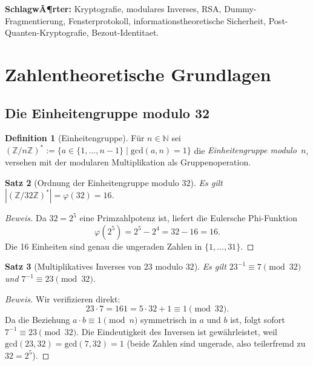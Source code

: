 ﻿\documentclass[12pt, a4paper]{article}
\theoremstyle{plain}
\newtheorem{theorem}{Satz}[section]
\theoremstyle{definition}
\newtheorem{definition}[theorem]{Definition}
\theoremstyle{remark}
\newenvironment{myproof}[1][Beweis]{%
  \begin{proof}[#1]
}{%
  \end{proof}
}
\newcommand{\Z}{\mathbb{Z}}
\newcommand{\N}{\mathbb{N}}
\newcommand{\GCD}{\mathrm{gcd}}
\begin{document}
\textbf{SchlagwÃ¶rter:} Kryptografie, modulares Inverses, RSA,
Dummy-Fragmentierung, Fensterprotokoll, informationstheoretische Sicherheit,
Post-Quanten-Kryptografie, Bezout-Identitaet.

\section{Zahlentheoretische Grundlagen}
\label{sec:grundlagen}

\subsection{Die Einheitengruppe modulo 32}

\begin{definition}[Einheitengruppe]\label{def:einheitengruppe}
  F\"ur $n \in \N$ sei $(\Z/n\Z)^* := \{a \in \{1,\ldots,n-1\} \mid \GCD(a,n)=1\}$
  die \emph{Einheitengruppe modulo~$n$}, versehen mit der modularen Multiplikation
  als Gruppenoperation.
\end{definition}

\begin{theorem}[Ordnung der Einheitengruppe modulo $32$]\label{thm:ordnung32}
  Es gilt $|(\Z/32\Z)^*| = \varphi(32) = 16$.
\end{theorem}

\begin{myproof}
  Da $32 = 2^5$ eine Primzahlpotenz ist, liefert die Eulersche Phi-Funktion
  \[
    \varphi(2^5) = 2^5 - 2^4 = 32 - 16 = 16.
  \]
  Die 16 Einheiten sind genau die ungeraden Zahlen in $\{1,\ldots,31\}$.
\end{myproof}

\begin{theorem}[Multiplikatives Inverses von $23$ modulo $32$]\label{thm:inverses}
  Es gilt $23^{-1} \equiv 7 \pmod{32}$ und $7^{-1} \equiv 23 \pmod{32}$.
\end{theorem}

\begin{myproof}
  Wir verifizieren direkt:
  \[
    23 \cdot 7 = 161 = 5 \cdot 32 + 1 \equiv 1 \pmod{32}.
  \]
  Da die Beziehung $a \cdot b \equiv 1 \pmod{n}$ symmetrisch in $a$ und $b$ ist,
  folgt sofort $7^{-1} \equiv 23 \pmod{32}$.
  Die Eindeutigkeit des Inversen ist gew\"ahrleistet, weil
  $\GCD(23, 32) = \GCD(7, 32) = 1$ (beide Zahlen sind ungerade, also teilerfremd
  zu $32 = 2^5$).
\end{myproof}
\end{document}

